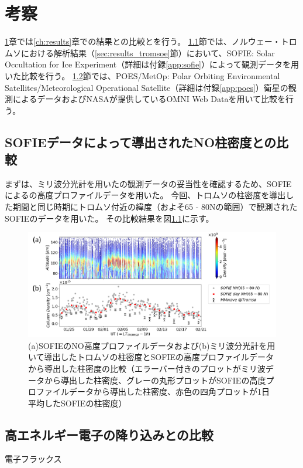 \chapter{考察}
\label{ch:discussion}
\ref{ch:discussion}章では\ref{ch:results}章での結果との比較とを行う。
\ref{sec:comparison_sofie}節では、ノルウェー・トロムソにおける解析結果（\ref{sec:results_tromsoe}節）において、SOFIE: Solar Occultation for Ice Experiment（詳細は付録\ref{app:sofie}）によって観測データを用いた比較を行う。
\ref{sec:comparison_eep}節では、POES/MetOp: Polar Orbiting Environmental Satellites/Meteorological Operational Satellite（詳細は付録\ref{app:poes}）衛星の観測によるデータおよびNASAが提供しているOMNI Web Dataを用いて比較を行う。


\section{SOFIEデータによって導出されたNO柱密度との比較}
\label{sec:comparison_sofie}
まずは、ミリ波分光計を用いたの観測データの妥当性を確認するため、SOFIEによるの高度プロファイルデータを用いた。
今回、トロムソの柱密度を導出した期間と同じ時期にトロムソ付近の緯度（およそ65 - 80\textdegree Nの範囲）で観測されたSOFIEのデータを用いた。
その比較結果を図\ref{fig:sofie_mmcd}に示す。
\begin{figure}[htbp]
    \centering
    \includegraphics[width=\linewidth]{master_thesis_contents/master_thesis_fig/sofie_mmcd.pdf}
    \caption{(a)SOFIEのNO高度プロファイルデータおよび(b)ミリ波分光計を用いて導出したトロムソの柱密度とSOFIEの高度プロファイルデータから導出した柱密度の比較（エラーバー付きのプロットがミリ波データから導出した柱密度、グレーの丸形プロットがSOFIEの高度プロファイルデータから導出した柱密度、赤色の四角プロットが1日平均したSOFIEの柱密度）}
    \label{fig:sofie_mmcd}
\end{figure}



\section{高エネルギー電子の降り込みとの比較}
\label{sec:comparison_eep}
電子フラックス

